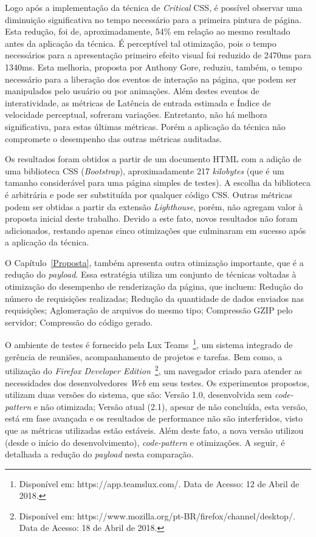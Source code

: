 Logo após a implementação da técnica de \textit{Critical} CSS, é possível observar uma diminuição significativa no tempo necessário para a primeira pintura de página. Esta redução, foi de, aproximadamente, 54\% em relação ao mesmo resultado antes da aplicação da técnica. É perceptível tal otimização, pois o tempo necessários para a apresentação primeiro efeito visual foi reduzido de 2470ms para 1340ms. Esta melhoria, proposta por Anthony Gore, reduziu, também, o tempo necessário para a liberação dos eventos de interação na página, que podem ser manipulados pelo usuário ou por animações. Além destes eventos de interatividade, as métricas de Latência de entrada estimada e Índice de velocidade perceptual, sofreram variações. Entretanto, não há melhora significativa, para estas últimas métricas. Porém a aplicação da técnica não compromete o desempenho das outras métricas auditadas.

Os resultados foram obtidos a partir de um documento HTML com a adição de uma biblioteca CSS (\textit{Bootstrap}), aproximadamente 217 \textit{kilobytes} (que é um tamanho considerável para uma página simples de testes). A escolha da biblioteca é arbitrária e pode ser substituída por qualquer código CSS. Outras métricas podem ser obtidas a partir da extensão \textit{Lighthouse}, porém, não agregam valor à proposta inicial deste trabalho. Devido a este fato, novos resultados não foram adicionados, restando apenas cinco otimizações que culminaram em sucesso após a aplicação da técnica.

O Capítulo~\ref{Proposta}, também apresenta outra otimização importante, que é a redução do \textit{payload}. Essa estratégia utiliza um conjunto de técnicas voltadas à otimização do desempenho de renderização da página, que incluem: Redução do número de requisições realizadas; Redução da quantidade de dados enviados nas requisições; Aglomeração de arquivos do mesmo tipo; Compressão GZIP pelo servidor; Compressão do código gerado.

O ambiente de testes é fornecido pela Lux Teams~\footnote{Disponível em: https://app.teamslux.com/. Data de Acesso: 12 de Abril de 2018.}, um sistema integrado de gerência de reuniões, acompanhamento de projetos e tarefas. Bem como, a utilização do \textit{Firefox Developer Edition}~\footnote{Disponível em: https://www.mozilla.org/pt-BR/firefox/channel/desktop/. Data de Acesso: 18 de Abril de 2018.}, um navegador criado para atender as necessidades dos desenvolvedores \textit{Web} em seus testes. Os experimentos propostos, utilizam duas versões do sistema, que são: Versão 1.0, desenvolvida sem \textit{code-pattern} e não otimizada; Versão atual (2.1), apesar de não concluída, esta versão, está em fase avançada e os resultados de performance não são interferidos, visto que as métricas utilizadas estão estáveis. Além deste fato, a nova versão utilizou (desde o início do desenvolvimento), \textit{code-pattern} e otimizações. A seguir, é detalhada a redução do \textit{payload} nesta comparação.

